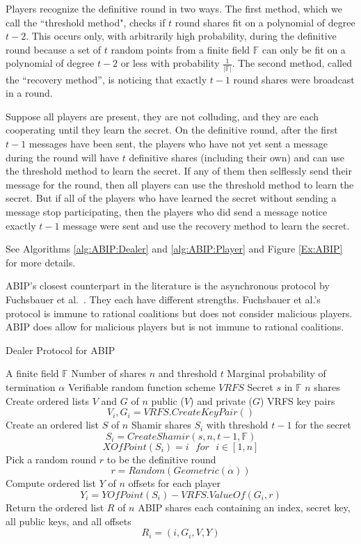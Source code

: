 \documentclass[12pt]{dalcsthesis}
\begin{document}
Players recognize the definitive round in two ways. The first method, which we call the ``threshold method", checks if $t$ round shares fit on a polynomial of degree $t-2$. This occurs only, with arbitrarily high probability, during the definitive round because a set of $t$ random points from a finite field $\mathbb{F}$ can only be fit on a polynomial of degree $t-2$ or less with probability $\frac{1}{|\mathbb{F}|}$. The second method, called the ``recovery method'', is noticing that exactly $t-1$ round shares were broadcast in a round.

Suppose all players are present, they are not colluding, and they are each cooperating until they learn the secret. On the definitive round, after the first $t-1$ messages have been sent, the players who have not yet sent a message during the round will have $t$ definitive shares (including their own) and can use the threshold method to learn the secret. If any of them then selflessly send their message for the round, then all players can use the threshold method to learn the secret. But if all of the players who have learned the secret without sending a message stop participating, then the players who did send a message notice exactly $t-1$ message were sent and use the recovery method to learn the secret.

See Algorithms \ref{alg:ABIP:Dealer} and \ref{alg:ABIP:Player} and Figure \ref{Ex:ABIP} for more details.

ABIP's closest counterpart in the literature is the asynchronous protocol by Fuchsbauer et al.~\cite{fuch10}. They each have different strengths. Fuchsbauer et al.'s protocol is immune to rational coalitions but does not consider malicious players. ABIP does allow for malicious players but is not immune to rational coalitions.

\begin{algorithm}
  \caption{Dealer Protocol for ABIP}
  \label{alg:ABIP:Dealer}
  \begin{algorithmic}
    \INPUT A finite field $\mathbb{F}$
    \INPUT Number of shares $n$ and threshold $t$
    \INPUT Marginal probability of termination $\alpha$
    \INPUT Verifiable random function scheme $VRFS$
    \INPUT Secret $s$ in $\mathbb{F}$
    \OUTPUT $n$ shares
    \STATE Create ordered lists $V$ and $G$ of $n$ public ($V$) and private ($G$) VRFS key pairs
    	$$V_i, G_i = VRFS.CreateKeyPair()$$
    \STATE Create an ordered list $S$ of $n$ Shamir shares $S_i$ with threshold $t-1$ for the secret
    	$$S_i = CreateShamir(s, n, t - 1, \mathbb{F})$$
    	$$XOfPoint(S_i) = i \text{ } for \text{ } i \in [1, n]$$
    \STATE Pick a random round $r$ to be the definitive round
        $$r = Random(Geometric(\alpha))$$
    \STATE Compute ordered list $Y$ of $n$ offsets for each player
    	$$Y_i = YOfPoint(S_i) - VRFS.ValueOf(G_i, r)$$
    \STATE Return the ordered list $R$ of $n$ ABIP shares each containing an index, secret key, all public keys, and all offsets 
    	$$R_i = (i, G_i, V, Y)$$
  \end{algorithmic}
\end{algorithm}
\end{document}
